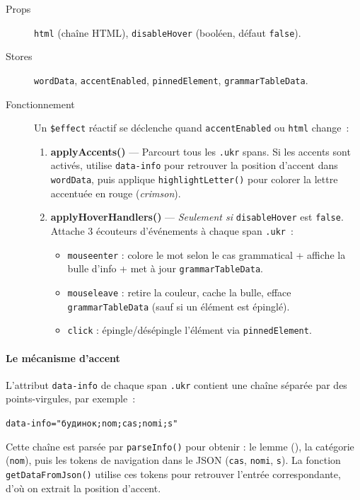 \begin{description}
  \item[Props] \texttt{html} (chaîne HTML), \texttt{disableHover} (booléen, défaut \texttt{false}).
  \item[Stores] \texttt{wordData}, \texttt{accentEnabled}, \texttt{pinnedElement}, \texttt{grammarTableData}.
  \item[Fonctionnement] Un \texttt{\$effect} réactif se déclenche quand \texttt{accentEnabled} ou \texttt{html} change~:
  \begin{enumerate}
    \item \textbf{applyAccents()} --- Parcourt tous les \texttt{.ukr} spans. Si les accents sont activés, utilise \texttt{data-info} pour retrouver la position d'accent dans \texttt{wordData}, puis applique \texttt{highlightLetter()} pour colorer la lettre accentuée en rouge (\textit{crimson}).
    \item \textbf{applyHoverHandlers()} --- \emph{Seulement si} \texttt{disableHover} est \texttt{false}. Attache 3 écouteurs d'événements à chaque span \texttt{.ukr}~:
    \begin{itemize}
      \item \texttt{mouseenter} : colore le mot selon le cas grammatical + affiche la bulle d'info + met à jour \texttt{grammarTableData}.
      \item \texttt{mouseleave} : retire la couleur, cache la bulle, efface \texttt{grammarTableData} (sauf si un élément est épinglé).
      \item \texttt{click} : épingle/désépingle l'élément via \texttt{pinnedElement}.
    \end{itemize}
  \end{enumerate}
\end{description}

\paragraph{Le mécanisme d'accent} L'attribut \texttt{data-info} de chaque span \texttt{.ukr} contient une chaîne séparée par des points-virgules, par exemple~:

\begin{ukrbox}
\texttt{data-info="будинок;nom;cas;nomi;s"}
\end{ukrbox}

Cette chaîne est parsée par \texttt{parseInfo()} pour obtenir : le lemme (), la catégorie (\texttt{nom}), puis les tokens de navigation dans le JSON (\texttt{cas}, \texttt{nomi}, \texttt{s}). La fonction \texttt{getDataFromJson()} utilise ces tokens pour retrouver l'entrée correspondante, d'où on extrait la position d'accent.

